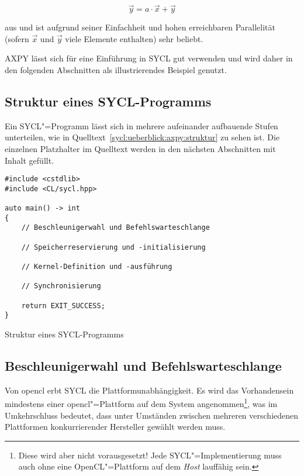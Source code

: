 \begin{equation}\label{sycl:ueberblick:axpy:formel}
    \vec{y} = a \cdot \vec{x} + \vec{y}
\end{equation}

aus und ist aufgrund seiner Einfachheit und hohen erreichbaren Parallelität
(sofern $\vec{x}$ und $\vec{y}$ viele Elemente enthalten) sehr beliebt.

AXPY lässt sich für eine Einführung in SYCL gut verwenden und wird daher in den
folgenden Abschnitten als illustrierendes Beispiel genutzt.

\subsection{Struktur eines SYCL-Programms}

Ein SYCL"=Programm lässt sich in mehrere aufeinander aufbauende Stufen
unterteilen, wie in Quelltext~\ref{sycl:ueberblick:axpy:struktur} zu sehen ist.
Die einzelnen Platzhalter im Quelltext werden in den nächsten Abschnitten mit
Inhalt gefüllt.

\begin{code}
    \begin{verbatim}
#include <cstdlib>
#include <CL/sycl.hpp>

auto main() -> int
{
    // Beschleunigerwahl und Befehlswarteschlange

    // Speicherreservierung und -initialisierung

    // Kernel-Definition und -ausführung

    // Synchronisierung

    return EXIT_SUCCESS;
}
    \end{verbatim}
    \caption{Struktur eines SYCL-Programms}
    \label{sycl:ueberblick:axpy:struktur}
\end{code}

\subsection{Beschleunigerwahl und Befehlswarteschlange}
\label{sycl:ueberblick:axpy:queue}

Von \gls{opencl} erbt SYCL die Plattformunabhängigkeit. Es wird das
Vorhandensein mindestens einer \gls{opencl}"=Plattform auf dem System
angenommen\footnote{Diese wird aber nicht vorausgesetzt! Jede
SYCL"=Implementierung muss auch ohne eine OpenCL"=Plattform auf dem
\textit{Host} lauffähig sein.}, was im Umkehrschluss bedeutet, dass unter
Umständen zwischen mehreren verschiedenen Plattformen konkurrierender Hersteller
gewählt werden muss. 

